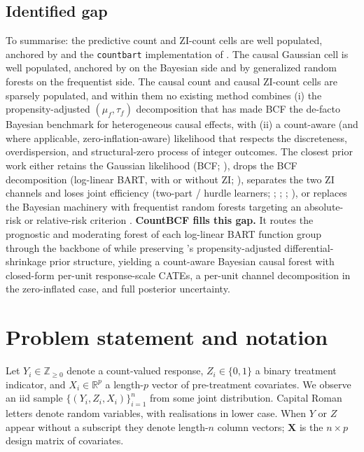 \documentclass[11pt]{article}
\theoremstyle{plain}
\theoremstyle{definition}
\theoremstyle{remark}
\newcommand{\X}{\mathbf{X}}
\newcommand{\muF}{\mu_f}
\newcommand{\tauF}{\tau_f}
\begin{document}
\subsection{Identified gap}\label{sec:lit-gap}

To summarise: the predictive count and ZI-count cells are well
populated, anchored by \citet{murray2021loglinear} and the
\texttt{countbart} implementation of \citet{wikle2023causal}. The
causal Gaussian cell is well populated, anchored by
\citet{hahn2020bayesian} on the Bayesian side and by generalized
random forests \citep{athey2019generalized, wager2018estimation} on
the frequentist side. The causal count and causal ZI-count cells are
sparsely populated, and within them no existing method combines (i)
the propensity-adjusted $(\muF, \tauF)$ decomposition that has made
BCF the de-facto Bayesian benchmark for heterogeneous causal effects,
with (ii) a count-aware (and where applicable, zero-inflation-aware)
likelihood that respects the discreteness, overdispersion, and
structural-zero process of integer outcomes. The closest prior work
either retains the Gaussian likelihood (BCF;
\citealp{hahn2020bayesian}), drops the BCF decomposition (log-linear
BART, with or without ZI; \citealp{murray2021loglinear}), separates
the two ZI channels and loses joint efficiency (two-part / hurdle
learners; \citealp{mullahy1986hurdle}; \citealp{guo2016mediation};
\citealp{yu2022msnmm}; \citealp{oganisian2021bayesian}), or replaces
the Bayesian machinery with frequentist random forests targeting an
absolute-risk or relative-risk criterion
\citep{athey2019generalized, kennedy2024relative}.
\textbf{CountBCF fills this gap.} It routes the prognostic and
moderating forest of each log-linear BART function group through the
backbone of \citet{murray2021loglinear} while preserving
\citeauthor{hahn2020bayesian}'s propensity-adjusted
differential-shrinkage prior structure, yielding a count-aware
Bayesian causal forest with closed-form per-unit response-scale
CATEs, a per-unit channel decomposition in the zero-inflated case,
and full posterior uncertainty.

\section{Problem statement and notation}\label{sec:notation}

Let $Y_i \in \mathbb{Z}_{\ge 0}$ denote a count-valued response,
$Z_i \in \{0, 1\}$ a binary treatment indicator, and
$X_i \in \mathbb{R}^p$ a length-$p$ vector of pre-treatment covariates.
We observe an iid sample $\{(Y_i, Z_i, X_i)\}_{i=1}^n$ from some joint
distribution. Capital Roman letters denote random variables, with
realisations in lower case. When $Y$ or $Z$ appear without a subscript
they denote length-$n$ column vectors; $\X$ is the $n \times p$ design
matrix of covariates.
\end{document}
